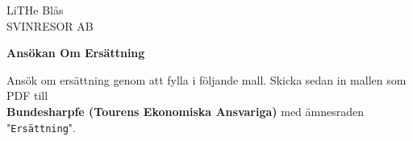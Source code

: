 
\begin{flushright}
    \Large{LiTHe Blås \\
    SVINRESOR AB}
\end{flushright}

\vspace{4cm} %

\noindent\textbf{\LARGE Ansökan Om Ersättning}

\vspace{0.5cm}

\noindent Ansök om ersättning genom att fylla i följande mall. Skicka sedan in mallen som PDF till \\
\textbf{Bundesharpfe (Tourens Ekonomiska Ansvariga)} med ämnesraden "\texttt{Ersättning}".

\vspace{0.7cm}

